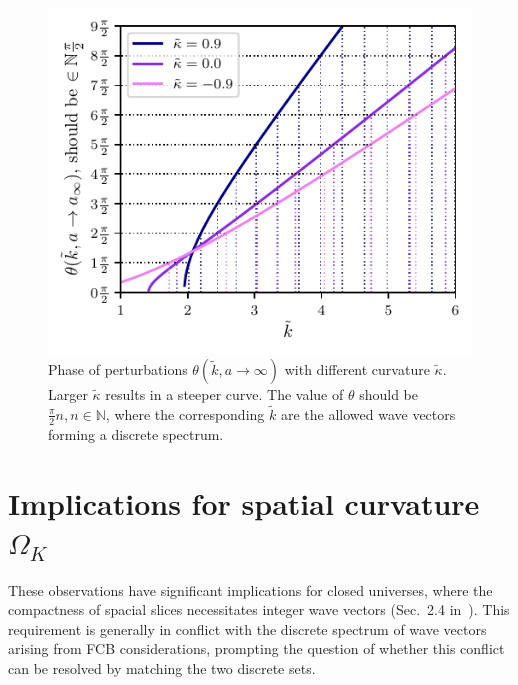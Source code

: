 \documentclass[%
 reprint,
 amsmath,amssymb,
 prl,
]{revtex4-2}
\begin{document}
\begin{figure}
     \includegraphics{theta_discretek.pdf}
     \caption{Phase of perturbations \(\theta(\tilde{k},a\rightarrow \infty)\) with different curvature \(\tilde\kappa\). Larger \(\tilde\kappa\) results in a steeper curve. The value of \(\theta\) should be \(\frac{\pi}{2}n, n\in\mathbb{N}\), where the corresponding \(\tilde k\) are the allowed wave vectors forming a discrete spectrum.}
     \label{fig:theta_diffK}
\end{figure}



\section{Implications for spatial curvature \(\Omega_K\)} 
These observations have significant implications for closed universes, where the compactness of spacial slices necessitates integer wave vectors (Sec.~2.4 in~\cite{2017CCoPh..22..852T}). This requirement is generally in conflict with the discrete spectrum of wave vectors arising from FCB considerations, prompting the question of whether this conflict can be resolved by matching the two discrete sets.
\end{document}
